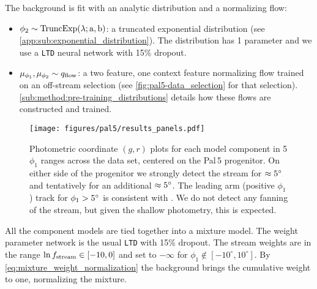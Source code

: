 \documentclass[twocolumn, linenumbers]{aastex631}
\newcommand{\stream}[1]{#1}
\begin{document}
        The background is fit with an analytic distribution and a normalizing
        flow:
        \begin{itemize}
            \setlength\itemsep{0em}
            \item $\phi_2 \sim \rm{TruncExp}(\lambda; a, b)$: a truncated
                exponential distribution (see
                \autoref{app:sub:exponential_distribution}).  The distribution
                has 1 parameter and we use a \texttt{LTD} neural network with
                15\% dropout.
            \item $\mu_{\phi_1}, \mu_{\phi_2} \sim q_{\rm flow}$: a two feature,
                one context feature normalizing flow trained on an off-stream
                selection (see
                \autoref{fig:pal5-data_selection} for that
                selection). \autoref{sub:method:pre-training_distributions}
                details how these flows are constructed and trained.
        \end{itemize}

        \begin{figure*}[tp]
            \centering
            \texttt{[image: figures/pal5/results\_panels.pdf]}
            \caption{%
                Photometric coordinate $(g, r)$ plots for each model component
                in 5 $\phi_1$ ranges across the data set, centered on the
                \stream{Pal\,5} progenitor.
                On either side of the progenitor we strongly detect the stream
                for $\approx 5\degree$ and tentatively for an additional
                $\approx 5\degree$. The leading arm (positive $\phi_1$) track
                for $\phi_1 > 5\degree$ is consistent with
                \citet{Starkman+2019}. We do not detect any fanning of the
                stream, but given the shallow photometry, this is expected.
            }
            \label{fig:pal5-results-panels}
        \end{figure*}

        All the component models are tied together into a mixture model.  The
        weight parameter network is the usual \texttt{LTD} with 15\% dropout.
        The stream weights are in the range $\ln{f_{\rm stream}} \in [-10, 0]$
        and set to $-\infty$ for $\phi_1 \notin [-10^\circ, 10^\circ]$. By
        \autoref{eq:mixture_weight_normalization} the background  brings the
        cumulative weight to one, normalizing the mixture.
\end{document}
